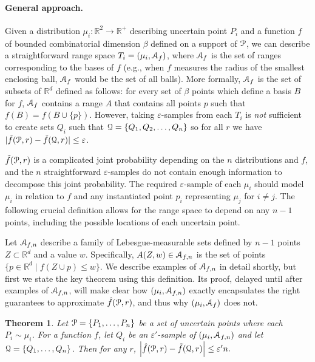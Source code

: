 \documentclass{journal}
\newcommand{\eps}{\varepsilon}
\newcommand{\Eu}[1]{\ensuremath{\EuScript{#1}}}
\newcommand{\R}{\ensuremath{\mathbb{R}}}
\newcommand{\pset}{support\xspace}
\newtheorem {theorem}{Theorem}[section]
\begin{document}
\paragraph{General approach.}
Given a distribution $\mu_i : \R^2 \to \R^+$ describing uncertain point $P_i$ and a function $f$ of bounded combinatorial dimension $\beta$ defined on a \pset of $\Eu P$, we can describe a straightforward range space $T_i = (\mu_i, \Eu A_f)$, where $\Eu A_f$ is the set of ranges corresponding to the bases of $f$ (e.g., when $f$ measures the radius of the smallest enclosing ball, $\Eu A_f$ would be the set of all balls).
More formally, $\Eu A_f$ is the set of subsets of $\R^d$ defined as follows: for every set of $\beta$ points which define a basis $B$ for $f$, $\Eu A_f$ contains a range $A$ that contains all points $p$ such that $f(B) = f(B \cup \{p\})$.
However, taking $\eps$-samples from each $T_i$ is \emph{not} sufficient to create sets $Q_i$ such that $\Eu Q = \{Q_1, Q_2, \ldots, Q_n\}$ so for all $r$ we have $|\tilde f(\Eu P, r) - \tilde f(\Eu Q, r) | \leq \eps$.

$\tilde f(\Eu P, r)$ is a complicated joint probability depending on the $n$ distributions and $f$, and the $n$ straightforward $\eps$-samples do not contain enough information to decompose this joint probability.  
The required $\eps$-sample of each $\mu_i$ should model $\mu_i$ in relation to $f$ and any instantiated point $p_i$ representing $\mu_j$ for $i\neq j$.  
The following crucial definition allows for the range space to depend on any $n-1$ points, including the possible locations of each uncertain point.  

Let $\Eu{A}_{f,n}$ describe a family of Lebesgue-measurable sets defined by $n-1$ points $Z \subset \R^d$ and a value $w$.  Specifically, $A(Z,w) \in \Eu{A}_{f,n}$ is the set of points $\{p \in \R^d \mid f(Z \cup p) \leq w\}$.
We describe examples of $\Eu A_{f,n}$ in detail shortly, but first we state the key theorem using this definition.  Its proof, delayed until after examples of $\Eu A_{f,n}$, will make clear how $(\mu_i, \Eu{A}_{f,n})$ exactly encapsulates the right guarantees to approximate $\hat f(\Eu P, r)$, and thus why $(\mu_i, \Eu A_f)$ does not.  


\begin{theorem} \label{thm:n-apx}
Let $\Eu P = \{P_1, \ldots, P_n\}$ be a set of uncertain points where each $P_i \sim \mu_i$.  
For a function $f$, let $Q_i$ be an $\eps'$-sample of $(\mu_i, \Eu A_{f,n})$ and let $\Eu Q = \{Q_1, \ldots, Q_n\}$.
Then for any $r$, 
$\left| \hat f(\Eu P, r)  - \tilde f(\Eu Q, r) \right| \leq  \eps^\prime n.$
\end{theorem}
\end{document}

